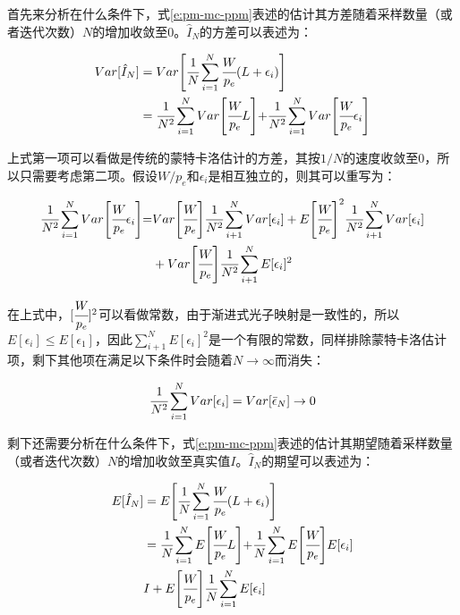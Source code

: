 首先来分析在什么条件下，式\ref{e:pm-mc-ppm}表述的估计其方差随着采样数量（或者迭代次数）$N$的增加收敛至0。$\hat{I}_N$的方差可以表述为：

\begin{equation}
\begin{aligned}
	Var[\hat{I}_N]&=Var\Biggl[ \cfrac{1}{N}\sum^{N}_{i=1} \cfrac{W}{p_e}(L+\epsilon_i) \Biggl]\\
	&= \cfrac{1}{N^{2}}\sum^{N}_{i=1}Var\Biggl[ \cfrac{W}{p_e}L \Biggl]+ \cfrac{1}{N^{2}}\sum^{N}_{i=1}Var\Biggl[ \cfrac{W}{p_e}\epsilon_i \Biggl]
\end{aligned}
\end{equation}

\noindent 上式第一项可以看做是传统的蒙特卡洛估计的方差，其按$1/N$的速度收敛至0，所以只需要考虑第二项。假设$W/p_e$和$\epsilon_i$是相互独立的，则其可以重写为：

\begin{equation}
\begin{aligned}
	 \cfrac{1}{N^{2}}\sum^{N}_{i=1}Var\Biggl[ \cfrac{W}{p_e}\epsilon_i \Biggl]=&Var\Biggl[ \cfrac{W}{p_e}\Biggl] \cfrac{1}{N^{2}}\sum^{N}_{i+1}Var[\epsilon_i]+E\Biggl[ \cfrac{W}{p_e}\Biggl]^{2} \cfrac{1}{N^{2}}\sum^{N}_{i+1}Var[\epsilon_i]\\
	&+Var\Biggl[ \cfrac{W}{p_e}\Biggl] \cfrac{1}{N^{2}}\sum^{N}_{i+1}E[\epsilon_i]^{2}
\end{aligned}
\end{equation}

\noindent 在上式中，$[ \cfrac{W}{p_e}]^{2}$可以看做常数，由于渐进式光子映射是一致性的，所以$E[\epsilon_i]\leq E[\epsilon_1]$，因此$\sum^{N}_{i+1}E[\epsilon_i]^{2}$是一个有限的常数，同样排除蒙特卡洛估计项，剩下其他项在满足以下条件时会随着$N\to\infty$而消失：

\begin{equation}
	 \cfrac{1}{N^{2}}\sum^{N}_{i=1}Var[\epsilon_i]=Var[\bar{\epsilon}_N]\to 0
\end{equation}

剩下还需要分析在什么条件下，式\ref{e:pm-mc-ppm}表述的估计其期望随着采样数量（或者迭代次数）$N$的增加收敛至真实值$I$。$\hat{I}_N$的期望可以表述为：

\begin{equation}
\begin{aligned}
	E[\hat{I}_N]&=E\Biggl[  \cfrac{1}{N}\sum^{N}_{i=1} \cfrac{W}{p_e}(L+\epsilon_i) \Biggl]\\
	&= \cfrac{1}{N}\sum^{N}_{i=1}E\Biggl[ \cfrac{W}{p_e}L\Biggl]+  \cfrac{1}{N}\sum^{N}_{i=1}E\Biggl[ \cfrac{W}{p_e}\Biggl]E[\epsilon_i]\\
	&I+E\Biggl[ \cfrac{W}{p_e}\Biggl] \cfrac{1}{N}\sum^{N}_{i=1}E[\epsilon_i]
\end{aligned}
\end{equation}

